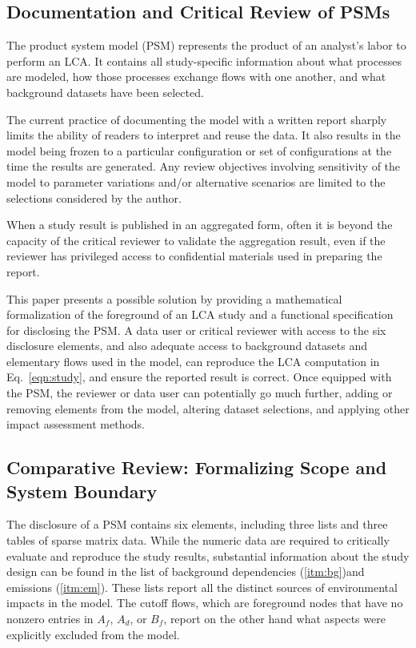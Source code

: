 \subsection{Documentation and Critical Review of PSMs}

The product system model (PSM) represents the product of an analyst's labor to perform an LCA.  It contains all study-specific information about what processes are modeled, how those processes exchange flows with one another, and what background datasets have been selected.

The current practice of documenting the model with a written report sharply limits the ability of readers to interpret and reuse the data.  It also results in the model being frozen to a particular configuration or set of configurations at the time the results are generated.  Any review objectives involving sensitivity of the model to parameter variations and/or alternative scenarios are limited to the selections considered by the author.

When a study result is published in an aggregated form, often it is beyond the capacity of the critical reviewer to validate the aggregation result, even if the reviewer has privileged access to confidential materials used in preparing the report. 

This paper presents a possible solution by providing a mathematical formalization of the foreground of an LCA study and a functional specification for disclosing the PSM.  A data user or critical reviewer with access to the six disclosure elements, and also adequate access to background datasets and elementary flows used in the model, can reproduce the LCA computation in Eq.~\ref{eqn:study}, and ensure the reported result is correct.  Once equipped with the PSM, the reviewer or data user can potentially go much further, adding or removing elements from the model, altering dataset selections, and applying other impact assessment methods.

\subsection{Comparative Review: Formalizing Scope and System Boundary}

The disclosure of a PSM contains six elements, including three lists and three tables of sparse matrix data.  While the numeric data are required to critically evaluate and reproduce the study results, substantial information about the study design can be found in the list of background dependencies (\ref{itm:bg})and emissions (\ref{itm:em}).  These lists report all the distinct sources of environmental impacts in the model.  The cutoff flows, which are foreground nodes that have no nonzero entries in $A_f$, $A_d$, or $B_f$, report on the other hand what aspects were explicitly excluded from the model.

